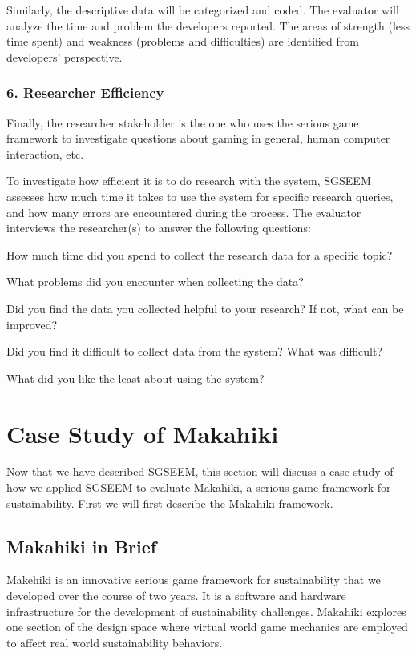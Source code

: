 \documentclass{sigchi}
\begin{document}
Similarly, the descriptive data will be categorized and coded. The evaluator will analyze
 the time and problem the developers reported.  The areas of strength (less time spent) and weakness (problems and difficulties) are identified from developers' perspective.

\subsubsection{6. Researcher Efficiency}

Finally, the researcher stakeholder is the one who uses the serious game framework to
investigate questions about gaming in general, human computer interaction, etc. 

To investigate how efficient it is to do research with the system, SGSEEM
assesses how much time it takes to use the system for specific research
queries, and how many errors are encountered during the process. The evaluator
interviews the researcher(s) to answer the following questions:
\begin{compactitem}
\item How much time did you spend to collect the research data for a
  specific topic?
\item What problems did you encounter when collecting the data?
\item Did you find the data you collected helpful to your research? If
  not, what can be improved?
\item Did you find it difficult to collect data from the system?
  What was difficult?
\item What did you like the least about using the system?
\end{compactitem}

\section{Case Study of Makahiki}

Now that we have described SGSEEM, this section will discuss
a case study of how we applied SGSEEM to evaluate Makahiki, a serious
game framework for sustainability. First we will first describe the
Makahiki framework.

\subsection{Makahiki in Brief}

Makehiki is an innovative serious game framework for sustainability that we developed
over the course of two years. It is a software and hardware infrastructure for the
development of sustainability challenges. Makahiki explores one section of the design
space where virtual world game mechanics are employed to affect real
world sustainability behaviors.
\end{document}
